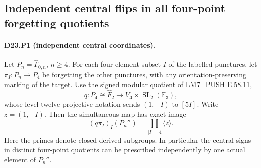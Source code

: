 \subsection{Independent central flips in all four-point forgetting quotients}

\paragraph{D23.P1 (independent central coordinates).}
Let $P_n=\widehat\Gamma_{0,n}$, $n\geq4$. For each four-element
subset $I$ of the labelled punctures, let $\pi_I:P_n\to P_4$ be
forgetting the other punctures, with any orientation-preserving marking
of the target. Use the signed modular quotient of LM7\_PUSH E.58.11,
\[
 q:P_4\cong\widehat F_2\longrightarrow
 V_4\times\operatorname{SL}_2(\mathbb F_3),
\]
whose level-twelve projective notation sends $(1,-I)$ to $[5I]$.
Write $z=(1,-I)$. Then the simultaneous map has exact image
\[
 (q\pi_I)_I(P_n'')=\prod_{|I|=4}\langle z\rangle.
 \tag{D23.P1.1}
\]
Here the primes denote closed derived subgroups. In particular the
central signs in distinct four-point quotients can be prescribed
independently by one actual element of $P_n''$.

